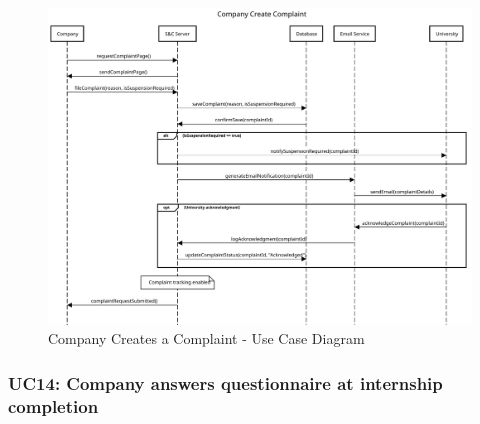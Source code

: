 \begin{figure}[H]
    \centering
    \includegraphics[width=1.0\textwidth]{Images/UC_13.pdf}
    \caption{Company Creates a Complaint - Use Case Diagram}
    \label{fig:use-case-diagram-13}
\end{figure}


\subsubsection{UC14: Company answers questionnaire at internship completion}
\label{subsubsec:company-answers-questionnaire-at-internship-completion}

